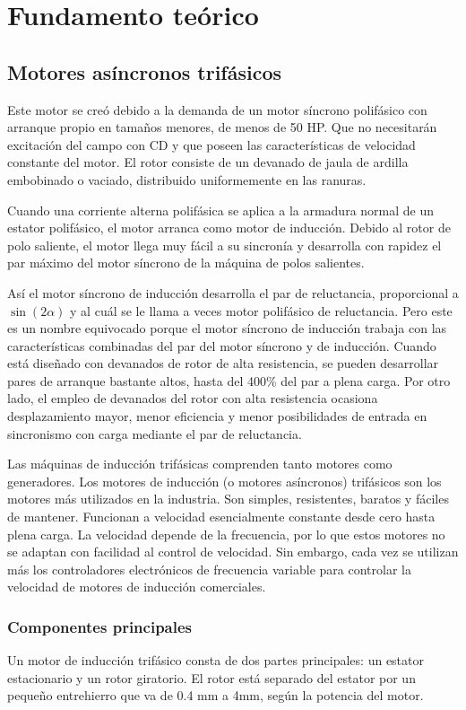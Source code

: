 \documentclass[a4paper,12pt]{article}
\begin{document}
\section{Fundamento teórico}
\subsection{Motores asíncronos trifásicos}
Este motor se creó debido a la demanda de un motor síncrono polifásico con arranque propio en tamaños menores, de menos de 50 HP. Que no necesitarán excitación del campo con CD y que poseen las características de velocidad constante del motor. El rotor consiste de un devanado de jaula de ardilla embobinado o vaciado, distribuido uniformemente en las ranuras.

Cuando una corriente alterna polifásica se aplica a la armadura normal de un estator polifásico, el motor arranca como motor de inducción. Debido al rotor de polo saliente, el motor llega muy fácil a su sincronía y desarrolla con rapidez el par máximo del motor síncrono de la máquina de polos salientes.

Así el motor síncrono de inducción desarrolla el par de reluctancia, proporcional a $\sin(2\alpha)$ y al cuál se le llama a veces motor polifásico de reluctancia. Pero este es un nombre equivocado porque el motor síncrono de inducción trabaja con las características combinadas del par del motor síncrono y de inducción. Cuando está diseñado con devanados de rotor de alta resistencia, se pueden desarrollar pares de arranque bastante altos, hasta del 400\% del par a plena carga. Por otro lado, el empleo de devanados del rotor con alta resistencia ocasiona desplazamiento mayor, menor eficiencia y menor posibilidades de entrada en sincronismo con carga mediante el par de reluctancia.

Las máquinas de inducción trifásicas comprenden tanto motores como generadores. Los motores de inducción (o motores asíncronos) trifásicos son los motores más utilizados en la industria. Son simples, resistentes, baratos y fáciles de mantener. Funcionan a velocidad esencialmente constante desde cero hasta plena carga. La velocidad depende de la frecuencia, por lo que estos motores no se adaptan con facilidad al control de velocidad. Sin embargo, cada vez se utilizan más los controladores electrónicos de frecuencia variable para controlar la velocidad de motores de inducción comerciales.

\subsubsection{Componentes principales}
Un motor de inducción trifásico consta de dos partes principales: un estator estacionario y un rotor giratorio. El rotor está separado del estator por un pequeño entrehierro que va de 0.4 mm a 4mm, según la potencia del motor.
\end{document}
